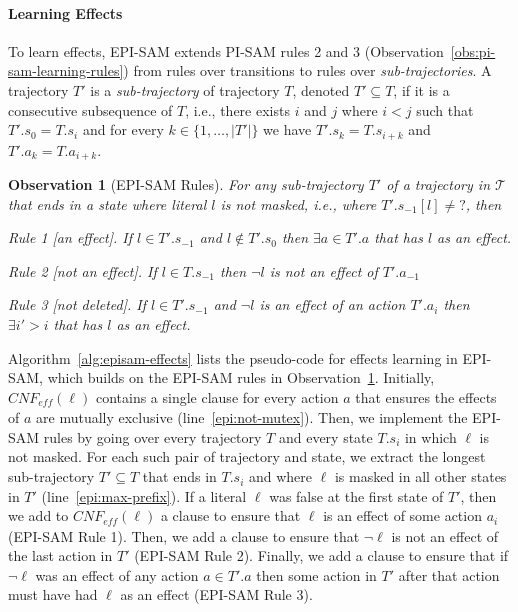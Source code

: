 \documentclass[letterpaper]{article} %
\newcommand{\eff}{\textit{eff}}
\newcommand{\cnf}{\textit{CNF}}
\newcommand{\true}{\textit{true}}
\newcommand{\unobserved}{\textit{?}}
\newtheorem{observation}[theorem]{Observation}
\begin{document}
\paragraph{Learning Effects}
To learn effects, EPI-SAM extends PI-SAM rules 2 and 3 (Observation~\ref{obs:pi-sam-learning-rules}) from rules over transitions to rules over \emph{sub-trajectories}. 
A trajectory $T'$ is a \emph{sub-trajectory} of trajectory $T$, denoted $T'\subseteq T$, if it is a consecutive subsequence of $T$, i.e., there exists $i$ and $j$ where $i<j$ such that  $T'.s_0=T.s_i$ 
and for every $k\in \{1,\ldots,|T'|\}$ we have $T'.s_k=T.s_{i+k}$ and $T'.a_k=T.a_{i+k}$. 

\begin{observation}[EPI-SAM Rules]
For any sub-trajectory $T'$ of a trajectory in $\mathcal{T}$ that ends in a state where literal $l$ is not masked, i.e., where $T'.s_{-1}[l]\neq\unobserved$, then
    \begin{compactitem}
        \item[Rule 1][an effect]. 
        If $l\in T'.s_{-1}$ and $l\notin T'.s_0$ 
        then $\exists a\in T'.a$ that has $l$ as an effect. 
        \item[Rule 2][not an effect]. 
        If $l\in T.s_{-1}$ then $\neg l$ is not an effect of $T'.a_{-1}$
        \item[Rule 3][not deleted].%
        If $l\in T'.s_{-1}$ and $\neg l$ is an effect of an action $T'.a_i$ then $\exists i'>i$ that has $l$ as an effect. 
    \end{compactitem}
\label{obs:epi-sam-learning-rules}
\end{observation}
Algorithm~\ref{alg:episam-effects} lists the pseudo-code for effects learning in EPI-SAM, which builds on the EPI-SAM rules in  Observation~\ref{obs:epi-sam-learning-rules}. 
Initially, $\cnf_\eff(\ell)$ contains a single clause for every action $a$ that ensures the effects of $a$ are mutually exclusive (line~\ref{epi:not-mutex}). 
Then, we implement the EPI-SAM rules by going over every trajectory $T$ and every state $T.s_i$ in which $\ell$ is not masked. 
For each such pair of trajectory and state, we extract the longest sub-trajectory $T'\subseteq T$ that ends in $T.s_i$ and where $\ell$ is masked in all other states in $T'$ (line~\ref{epi:max-prefix}). 
If a literal $\ell$ was false at the first state of $T'$, then we add to $\cnf_\eff(\ell)$ a clause to ensure that $\ell$ is an effect of some action $a_i$ (EPI-SAM Rule 1). 
Then, we add a clause to ensure that $\neg\ell$ is not an effect of the last action in $T'$ (EPI-SAM Rule 2). 
Finally, we add a clause to ensure that if $\neg \ell$ was an effect of any action $a\in T'.a$ 
then some action in $T'$ after that action must have had $\ell$ as an effect (EPI-SAM Rule 3). 
\end{document}

